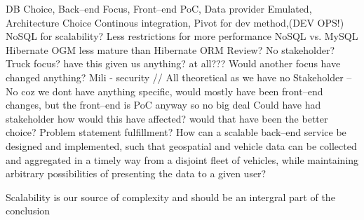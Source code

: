 DB Choice, Back--end Focus, Front--end PoC, Data provider Emulated, 
Architecture Choice
Continous integration, Pivot for dev method,(DEV OPS!)
NoSQL for scalability?
Less restrictions for more performance
NoSQL vs. MySQL
Hibernate OGM less mature than Hibernate ORM
Review?
No stakeholder?
Truck focus? have this given us anything? at all???
Would another focus have changed anything? Mili - security // All theoretical as we have no Stakeholder -- No coz we dont have anything specific, would mostly have been front--end changes, but the front--end is PoC anyway so no big deal
Could have had stakeholder how would this have affected? would that have been the better choice?
Problem statement fulfillment?
How can a scalable back–end service be designed and implemented, such that geospatial
and vehicle data can be collected and aggregated in a timely way from a disjoint fleet
of vehicles, while maintaining arbitrary possibilities of presenting the data to a given user?

Scalability is our source of complexity and should be an intergral part of the conclusion
